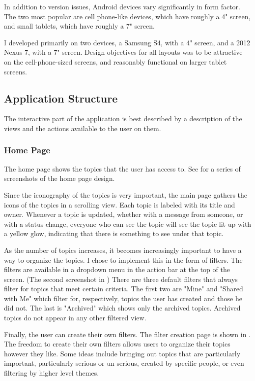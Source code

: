     In addition to version issues, Android devices vary significantly in form factor.
    The two most popular are cell phone-like devices, which have roughly a 4" screen,
    and small tablets, which have roughly a 7" screen.

    I developed primarily on two devices, a Samsung S4, with a 4" screen,
    and a 2012 Nexus 7, with a 7" screen.
    Design objectives for all layouts was to be attractive on the cell-phone-sized screens,
    and reasonably functional on larger tablet screens.

    \subsection{Application Structure}
    The interactive part of the application is best described by a description of the views
    and the actions available to the user on them.
      \subsubsection{Home Page}
      The home page shows the topics that the user has access to.
      See \cite{} for a series of screenshots of the home page design.

      Since the iconography of the topics is very important,
      the main page gathers the icons of the topics in a scrolling view.
      Each topic is labeled with its title and owner.
      Whenever a topic is updated, whether with a message from someone,
      or with a status change, everyone who can see the topic will see the topic
      lit up with a yellow glow, indicating that there is something to see under that topic.

      As the number of topics increases,
      it becomes increasingly important to have a way to organize the topics.
      I chose to implement this in the form of filters.
      The filters are available in a dropdown menu in the action bar at the top of the screen.
      (The second screenshot in \cite{})
      There are three default filters that always filter for topics that meet certain criteria.
      The first two are "Mine" and "Shared with Me"
      which filter for, respectively, topics the user has created and those he did not.
      The last is "Archived" which shows only the archived topics.
      Archived topics do not appear in any other filtered view.

      Finally, the user can create their own filters.
      The filter creation page is shown in \cite{}.
      The freedom to create their own filters allows users to organize
      their topics however they like.
      Some ideas include bringing out topics that are particularly important,
      particularly serious or un-serious, created by specific people,
      or even filtering by higher level themes.

